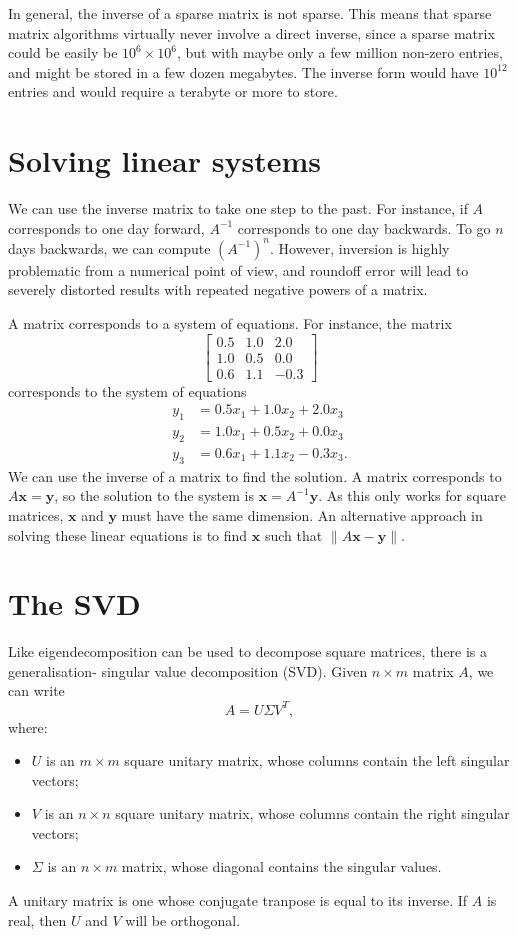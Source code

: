 \documentclass[a4paper, openany]{memoir}
\begin{document}
    In general, the inverse of a sparse matrix is not sparse. This means that sparse matrix algorithms virtually never involve a direct inverse, since a sparse matrix could be easily be $10^6 \times 10^6$, but with maybe only a few million non-zero entries, and might be stored in a few dozen megabytes. The inverse form would have $10^{12}$ entries and would require a terabyte or more to store.

    \section{Solving linear systems}
    We can use the inverse matrix to take one step to the past. For instance, if $A$ corresponds to one day forward, $A^{-1}$ corresponds to one day backwards. To go $n$ days backwards, we can compute $(A^{-1})^n$. However, inversion is highly problematic from a numerical point of view, and roundoff error will lead to severely distorted results with repeated negative powers of a matrix.

    A matrix corresponds to a system of equations. For instance, the matrix 
    \[\begin{bmatrix}
        0.5 & 1.0 & 2.0 \\
        1.0 & 0.5 & 0.0 \\
        0.6 & 1.1 & -0.3
    \end{bmatrix}\]
    corresponds to the system of equations 
    \begin{align*}
        y_1 &= 0.5x_1 + 1.0x_2 + 2.0x_3 \\
        y_2 &= 1.0x_1 + 0.5x_2 + 0.0x_3 \\
        y_3 &= 0.6x_1 + 1.1x_2 - 0.3x_3.
    \end{align*}
    We can use the inverse of a matrix to find the solution. A matrix corresponds to $A \mathbf{x} = \mathbf{y}$, so the solution to the system is $\mathbf{x} = A^{-1} \mathbf{y}$. As this only works for square matrices, $\mathbf{x}$ and $\mathbf{y}$ must have the same dimension. An alternative approach in solving these linear equations is to find $\mathbf{x}$ such that $\lVert A \mathbf{x} - \mathbf{y} \rVert$.
    
    \section{The SVD}
    Like eigendecomposition can be used to decompose square matrices, there is a generalisation- singular value decomposition (SVD). Given $n \times m$ matrix $A$, we can write
    \[A = U \Sigma V^T,\]
    where:
    \begin{itemize}
        \item $U$ is an $m \times m$ square unitary matrix, whose columns contain the left singular vectors;
        \item $V$ is an $n \times n$ square unitary matrix, whose columns contain the right singular vectors;
        \item $\Sigma$ is an $n \times m$ matrix, whose diagonal contains the singular values.
    \end{itemize}
    A unitary matrix is one whose conjugate tranpose is equal to its inverse. If $A$ is real, then $U$ and $V$ will be orthogonal.
\end{document}

